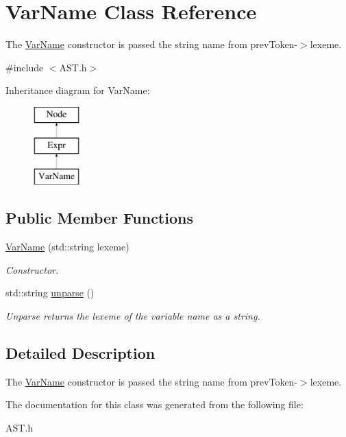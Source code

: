 \hypertarget{classVarName}{\section{Var\-Name Class Reference}
\label{classVarName}
}


The \hyperlink{classVarName}{Var\-Name} constructor is passed the string name from prev\-Token-\/$>$lexeme.  




{\ttfamily \#include $<$A\-S\-T.\-h$>$}

Inheritance diagram for Var\-Name\-:\begin{figure}[H]
\begin{center}
\leavevmode
\includegraphics[height=3.000000cm]{classVarName}
\end{center}
\end{figure}
\subsection*{Public Member Functions}
\begin{DoxyCompactItemize}
\item 
\hypertarget{classVarName_afbdf43cec964ba07edee8bdaf2599c28}{\hyperlink{classVarName_afbdf43cec964ba07edee8bdaf2599c28}{Var\-Name} (std\-::string lexeme)}\label{classVarName_afbdf43cec964ba07edee8bdaf2599c28}

\begin{DoxyCompactList}\small\item\em Constructor. \end{DoxyCompactList}\item 
\hypertarget{classVarName_af29612051468cad25343614de9bb067f}{std\-::string \hyperlink{classVarName_af29612051468cad25343614de9bb067f}{unparse} ()}\label{classVarName_af29612051468cad25343614de9bb067f}

\begin{DoxyCompactList}\small\item\em Unparse returns the lexeme of the variable name as a string. \end{DoxyCompactList}\end{DoxyCompactItemize}


\subsection{Detailed Description}
The \hyperlink{classVarName}{Var\-Name} constructor is passed the string name from prev\-Token-\/$>$lexeme. 

The documentation for this class was generated from the following file\-:\begin{DoxyCompactItemize}
\item 
A\-S\-T.\-h\end{DoxyCompactItemize}
